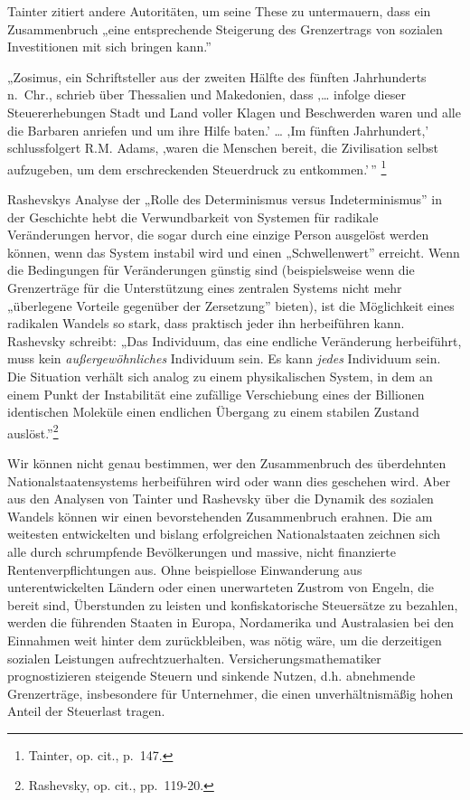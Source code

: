 \documentclass[
  a5paper,
  smalldemyvopaper,10pt,twoside,onecolumn,openright,extrafontsizes,hidelinks]{memoir}
\renewenvironment{quote}%
               {\list{}{\rightmargin=.6cm\leftmargin=.6cm}%
                \itshape \item[]}%
               {\endlist}
\begin{document}
Tainter zitiert andere Autoritäten, um seine These zu untermauern, dass
ein Zusammenbruch „eine entsprechende Steigerung des Grenzertrags von
sozialen Investitionen mit sich bringen kann.''

\begin{quote}
„Zosimus, ein Schriftsteller aus der zweiten Hälfte des fünften
Jahrhunderts n.~Chr., schrieb über Thessalien und Makedonien, dass
‚\ldots{} infolge dieser Steuererhebungen Stadt und Land voller Klagen
und Beschwerden waren und alle die Barbaren anriefen und um ihre Hilfe
baten.' \ldots{} ‚Im fünften Jahrhundert,' schlussfolgert R.M. Adams,
‚waren die Menschen bereit, die Zivilisation selbst aufzugeben, um dem
erschreckenden Steuerdruck zu entkommen.'\,'' \footnote{Tainter, op.
  cit., p.~147.}
\end{quote}

Rashevskys Analyse der „Rolle des Determinismus versus Indeterminismus''
in der Geschichte hebt die Verwundbarkeit von Systemen für radikale
Veränderungen hervor, die sogar durch eine einzige Person ausgelöst
werden können, wenn das System instabil wird und einen „Schwellenwert''
erreicht. Wenn die Bedingungen für Veränderungen günstig sind
(beispielsweise wenn die Grenzerträge für die Unterstützung eines
zentralen Systems nicht mehr „überlegene Vorteile gegenüber der
Zersetzung'' bieten), ist die Möglichkeit eines radikalen Wandels so
stark, dass praktisch jeder ihn herbeiführen kann. Rashevsky schreibt:
„Das Individuum, das eine endliche Veränderung herbeiführt, muss kein
\emph{außergewöhnliches} Individuum sein. Es kann \emph{jedes}
Individuum sein. Die Situation verhält sich analog zu einem
physikalischen System, in dem an einem Punkt der Instabilität eine
zufällige Verschiebung eines der Billionen identischen Moleküle einen
endlichen Übergang zu einem stabilen Zustand auslöst.''\footnote{Rashevsky,
  op. cit., pp.~119-20.}

Wir können nicht genau bestimmen, wer den Zusammenbruch des überdehnten
Nationalstaatensystems herbeiführen wird oder wann dies geschehen wird.
Aber aus den Analysen von Tainter und Rashevsky über die Dynamik des
sozialen Wandels können wir einen bevorstehenden Zusammenbruch erahnen.
Die am weitesten entwickelten und bislang erfolgreichen Nationalstaaten
zeichnen sich alle durch schrumpfende Bevölkerungen und massive, nicht
finanzierte Rentenverpflichtungen aus. Ohne beispiellose Einwanderung
aus unterentwickelten Ländern oder einen unerwarteten Zustrom von
Engeln, die bereit sind, Überstunden zu leisten und konfiskatorische
Steuersätze zu bezahlen, werden die führenden Staaten in Europa,
Nordamerika und Australasien bei den Einnahmen weit hinter dem
zurückbleiben, was nötig wäre, um die derzeitigen sozialen Leistungen
aufrechtzuerhalten. Versicherungsmathematiker prognostizieren steigende
Steuern und sinkende Nutzen, d.h. abnehmende Grenzerträge, insbesondere
für Unternehmer, die einen unverhältnismäßig hohen Anteil der Steuerlast
tragen.
\end{document}
